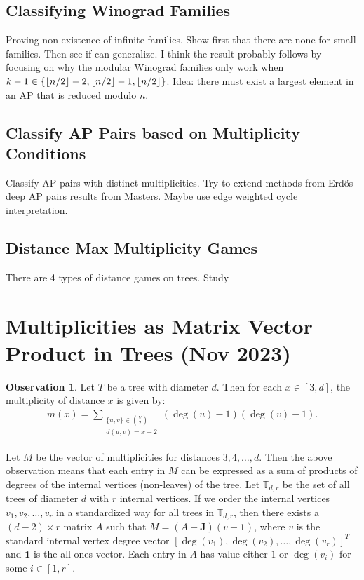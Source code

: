 \documentclass[12]{article}
\DeclarePairedDelimiter\floor{\lfloor}{\rfloor}
\theoremstyle{definition}
\newtheorem{obs}{Observation}
\begin{document}
	
	\subsection{Classifying Winograd Families}
	
	Proving non-existence of infinite families.  Show first that there are none for small families.  Then see if can generalize.  I think the result probably follows by focusing on why the modular Winograd families only work when $k-1 \in \{\floor{n/2}-2, \floor{n/2}-1, \floor{n/2}\}$.  Idea: there must exist a largest element in an AP that is reduced modulo $n$.
	
	\subsection{Classify AP Pairs based on Multiplicity Conditions}
	
	Classify AP pairs with distinct multiplicities.  Try to extend methods from Erd\H{o}s-deep AP pairs results from Masters.  Maybe use edge weighted cycle interpretation.
	
	\subsection{Distance Max Multiplicity Games}
	
	There are 4 types of distance games on trees.  Study
	
	\newpage
	
	\section{Multiplicities as Matrix Vector Product in Trees (Nov 2023)}
	
	\begin{obs}
		Let $T$ be a tree with diameter $d$.  Then for each $x \in [3,d]$, the multiplicity of distance $x$ is given by:
		\begin{align*}
		m(x) = \sum_{\substack{\{u,v\} \in {V \choose 2} \\ d(u,v) = x-2}} (\deg(u)-1)(\deg(v)-1).
		\end{align*}
	\end{obs}

	Let $M$ be the vector of multiplicities for distances $3, 4, \ldots, d$.  Then the above observation means that each entry in $M$ can be expressed as a sum of products of degrees of the internal vertices (non-leaves) of the tree.  Let $\mathbb{T}_{d,r}$ be the set of all trees of diameter $d$ with $r$ internal vertices.  If we order the internal vertices $v_1, v_2, \ldots, v_r$ in a standardized way for all trees in $\mathbb{T}_{d,r}$, then there exists a $(d-2) \times r$ matrix $A$ such that $M = (A - \mathbf{J})(v - \mathbf{1})$, where $v$ is the standard internal vertex degree vector $[\deg(v_1), \deg(v_2), \ldots, \deg(v_r)]^T$ and $\mathbf{1}$ is the all ones vector.  Each entry in $A$ has value either $1$ or $\deg(v_i)$ for some $i \in [1,r]$.
	
\end{document}
